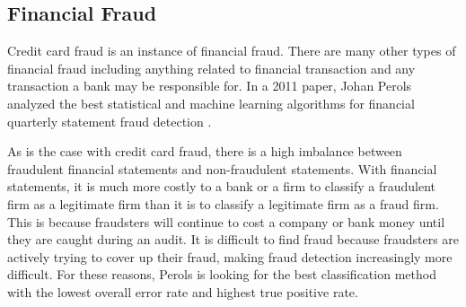\documentclass[midd]{thesis}
\begin{document}


\subsection{Financial Fraud}

Credit card fraud is an instance of financial fraud. There are many other types of financial fraud including anything related to financial transaction and any transaction a bank may be responsible for. In a 2011 paper, Johan Perols analyzed the best statistical and machine learning algorithms for financial quarterly statement fraud detection \cite{Perols2011}.  

As is the case with credit card fraud, there is a high imbalance between fraudulent financial statements and non-fraudulent statements. With financial statements, it is much more costly to a bank or a firm to classify a fraudulent firm as a legitimate firm than it is to classify a legitimate firm as a fraud firm. This is because fraudsters will continue to cost a company or bank money until they are caught during an audit. It is difficult to find fraud because fraudsters are actively trying to cover up their fraud, making fraud detection increasingly more difficult. For these reasons, Perols is looking for the best classification method with the lowest overall error rate and highest true positive rate. 
\end{document}
